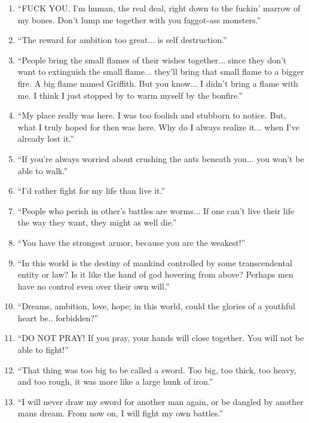 \documentclass{book}
\numberwithin{equation}{section}
\begin{document}
\begin{enumerate}
    \item ``FUCK YOU. I'm human, the real deal, right down to the fuckin' marrow of my bones. Don't lump me together with you faggot-ass monsters.''
    \item ``The reward for ambition too great$\ldots$ is self destruction.''
    \item ``People bring the small flames of their wishes together$\ldots$  since they don't want to extinguish the small flame$\ldots$  they'll bring that small flame to a bigger fire. A big flame named Griffith. But you know$\ldots$  I didn't bring a flame with me. I think I just stopped by to warm myself by the bonfire.''
    \item ``My place really was here. I was too foolish and stubborn to notice. But, what I truly hoped for then was here. Why do I always realize it$\ldots$ when I've already lost it.''
    \item ``If you're always worried about crushing the ants beneath you$\ldots$ you won't be able to walk.''
    \item ``I'd rather fight for my life than live it.''
    \item ``People who perish in other's battles are worms$\ldots$ If one can't live their life the way they want, they might as well die.''
    \item ``You have the strongest armor, because you are the weakest!''
    \item ``In this world is the destiny of mankind controlled by some transcendental entity or law? Is it like the hand of god hovering from above? Perhaps men have no control even over their own will.''
    \item ``Dreams, ambition, love, hope; in this world, could the glories of a youthful heart be.. forbidden?''
    \item ``DO NOT PRAY! If you pray, your hands will close together. You will not be able to fight!''
    \item ``That thing was too big to be called a sword. Too big, too thick, too heavy, and too rough, it was more like a large hunk of iron.'' 
    \item ``I will never draw my sword for another man again, or be dangled by another mans dream. From now on, I will fight my own battles.''
\end{enumerate}
\end{document}
